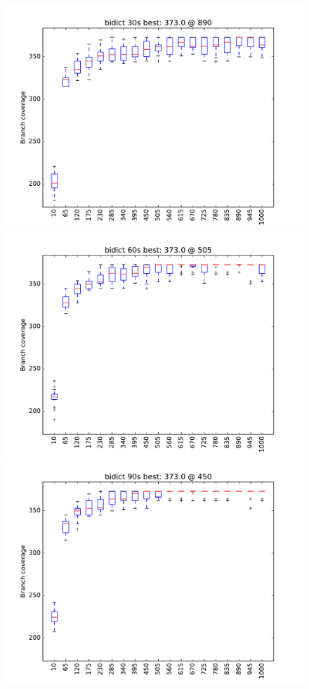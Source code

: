 \begin{figure}
\includegraphics[width=\columnwidth]{graphs/bidictrand30}
\includegraphics[width=\columnwidth]{graphs/bidictrand60}
\includegraphics[width=\columnwidth]{graphs/bidictrand90}
\end{figure}

